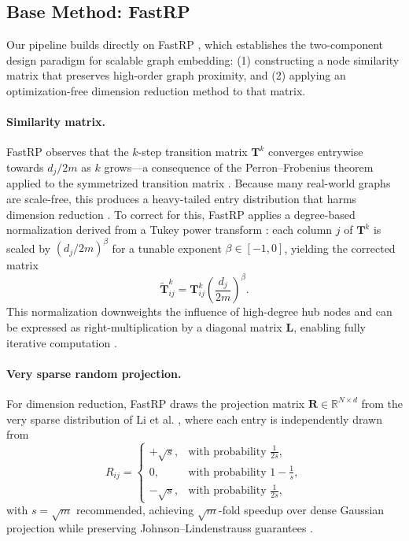 \documentclass[conference]{IEEEtran}
\begin{document}
\subsection{Base Method: FastRP}
\label{subsec:fastrp-base}

Our pipeline builds directly on FastRP \cite{chen2019fast}, which establishes
the two-component design paradigm for scalable graph embedding: (1)
constructing a node similarity matrix that preserves high-order graph
proximity, and (2) applying an optimization-free dimension reduction method
to that matrix.

\paragraph{Similarity matrix.}
FastRP \cite{chen2019fast} observes that the $k$-step transition matrix
$\mathbf{T}^k$ converges entrywise towards $d_j / 2m$ as $k$ grows---a
consequence of the Perron--Frobenius theorem applied to the symmetrized
transition matrix \cite{chen2019fast}. Because many real-world graphs are
scale-free, this produces a heavy-tailed entry distribution that harms
dimension reduction \cite{chen2019fast}. To correct for this, FastRP
\cite{chen2019fast} applies a degree-based normalization derived from a
Tukey power transform \cite{tukey1957}: each column $j$ of $\mathbf{T}^k$
is scaled by $(d_j / 2m)^{\beta}$ for a tunable exponent $\beta \in [-1, 0]$,
yielding the corrected matrix
\begin{equation}
    \widetilde{\mathbf{T}}^k_{ij}
        = \mathbf{T}^k_{ij} \left(\frac{d_j}{2m}\right)^{\beta}.
    \label{eq:fastrp-norm}
\end{equation}
This normalization downweights the influence of high-degree hub nodes and
can be expressed as right-multiplication by a diagonal matrix $\mathbf{L}$,
enabling fully iterative computation \cite{chen2019fast}.

\paragraph{Very sparse random projection.}
For dimension reduction, FastRP \cite{chen2019fast} draws the projection
matrix $\mathbf{R} \in \mathbb{R}^{N \times d}$ from the very sparse
distribution of Li et al. \cite{li2006very}, where each
entry is independently drawn from
\begin{equation}
    R_{ij} = \begin{cases}
        +\!\sqrt{s}, & \text{with probability } \tfrac{1}{2s},\\
        0,           & \text{with probability } 1 - \tfrac{1}{s},\\
        -\!\sqrt{s}, & \text{with probability } \tfrac{1}{2s},
    \end{cases}
    \label{eq:very-sparse}
\end{equation}
with $s = \sqrt{m}$ recommended, achieving $\sqrt{m}$-fold speedup over
dense Gaussian projection while preserving Johnson--Lindenstrauss
guarantees \cite{dasgupta1999,li2006very}.
\end{document}
